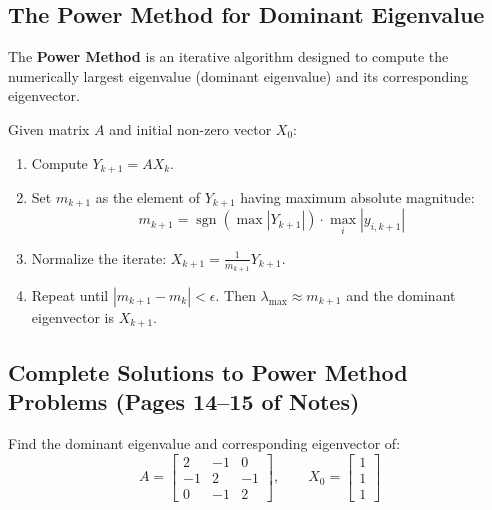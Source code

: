 \documentclass[11pt,a4paper]{article}
\begin{document}
\subsection{The Power Method for Dominant Eigenvalue}
The \textbf{Power Method} is an iterative algorithm designed to compute the numerically largest eigenvalue (dominant eigenvalue) and its corresponding eigenvector.

\begin{defbox}
Given matrix $A$ and initial non-zero vector $X_0$:
\begin{enumerate}
    \item Compute $Y_{k+1} = A X_k$.
    \item Set $m_{k+1}$ as the element of $Y_{k+1}$ having maximum absolute magnitude:
    $$m_{k+1} = \operatorname{sgn}\left(\max |Y_{k+1}|\right) \cdot \max_{i} |y_{i, k+1}|$$
    \item Normalize the iterate: $X_{k+1} = \frac{1}{m_{k+1}} Y_{k+1}$.
    \item Repeat until $|m_{k+1} - m_k| < \epsilon$. Then $\lambda_{\max} \approx m_{k+1}$ and the dominant eigenvector is $X_{k+1}$.
\end{enumerate}
\end{defbox}

\subsection{Complete Solutions to Power Method Problems (Pages 14--15 of Notes)}

\begin{exambox}
Find the dominant eigenvalue and corresponding eigenvector of:
\begin{equation}
    A = \begin{bmatrix} 2 & -1 & 0 \\ -1 & 2 & -1 \\ 0 & -1 & 2 \end{bmatrix}, \qquad X_0 = \begin{bmatrix} 1 \\ 1 \\ 1 \end{bmatrix}
\end{equation}
\end{exambox}
\end{document}
